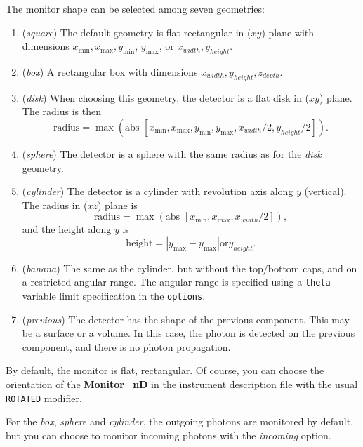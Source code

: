 The monitor shape can be selected among seven geometries:
\begin{enumerate}
\item{(\textit{square}) The default geometry is flat rectangular in ($xy$)
    plane with dimensions $x_\mathrm{min}, x_\mathrm{max}, y_\mathrm{min}$,
    $y_\mathrm{max}$, or $x_{width}, y_{height}$.}
\item{(\textit{box}) A rectangular box with dimensions $x_{width}, y_{height}, z_{depth}$.}
\item{(\textit{disk}) When choosing this geometry, the detector is a flat
    disk in ($xy$) plane. The radius is then
    \begin{equation}
      \mbox{radius} = \max ( \mbox{abs } [ x_\mathrm{min}, x_\mathrm{max}, y_\mathrm{
        min}, y_\mathrm{max}, x_{width}/2, y_{height}/2 ] ).
    \end{equation}
    }
\item{(\textit{sphere}) The detector is a sphere with the same radius as
    for the \textit{disk} geometry.}
\item{(\textit{cylinder}) The detector is a cylinder with revolution axis
    along $y$ (vertical). The radius in ($xz$) plane is
    \begin{equation}
      \mbox{radius} =  \max ( \mbox{abs } [ x_\mathrm{min}, x_\mathrm{max}, x_{width}/2 ] ),
    \end{equation}
    and the height along $y$ is
    \begin{equation}
      \mbox{height} =  | y_\mathrm{max} - y_\mathrm{max} | \mathrm{or} y_{height}.
    \end{equation}
    }
\item{(\textit{banana}) The same as the cylinder, but without the top/bottom caps, and on a restricted angular range. The angular range is specified using a \verb+theta+ variable limit specification in the \verb+options+.}
\item{(\textit{previous}) The detector has the shape of the previous component. This may be a surface or a volume. In this case, the photon is detected on the previous component, and there is no photon propagation.}
\end{enumerate}

By default, the monitor is flat, rectangular. Of course, you can choose
the orientation of the \textbf{Monitor\_nD} in the instrument description
file with the usual \texttt{ROTATED} modifier.

For the \textit{box}, \textit{sphere} and \textit{cylinder}, the outgoing photons are
monitored by default, but you can choose to monitor incoming photons
with the \textit{incoming} option.

